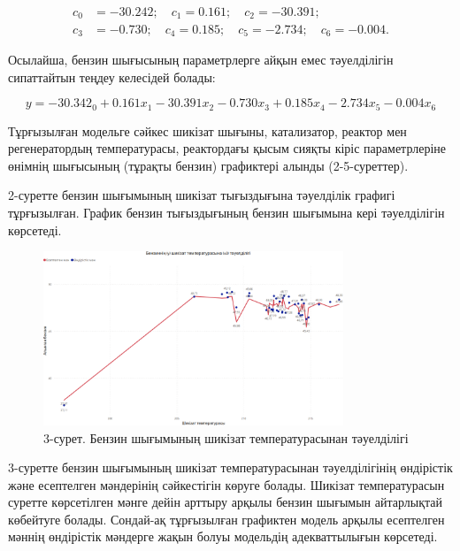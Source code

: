 \begin{equation*}
\begin{aligned}
c_0 &= -30.242; \quad c_1 = 0.161; \quad c_2 = -30.391; \\
c_3 &= -0.730; \quad c_4 = 0.185; \quad c_5 = -2.734; \quad c_6 = -0.004.
\end{aligned}
\end{equation*}

Осылайша, бензин шығысының параметрлерге айқын емес тәуелділігін
сипаттайтын теңдеу келесідей болады:

\begin{equation}
y=-30.342_0+0.161x_1-30.391x_2-0.730x_3+0.185x_4-2.734x_5-0.004x_6
\end{equation}

\begin{multicols}{2}
Тұрғызылған модельге сәйкес шикізат шығыны, катализатор, реактор мен
регенератордың температурасы, реактордағы қысым сияқты кіріс
параметрлеріне өнімнің шығысының (тұрақты бензин) графиктері алынды
(2-5-суреттер).

2-суретте бензин шығымының шикізат тығыздығына тәуелділік графигі
тұрғызылған. График бензин тығыздығының бензин шығымына кері
тәуелділігін көрсетеді.
\end{multicols}

\begin{figure}[H]
	\centering
	\includegraphics[width=0.8\textwidth]{media/ict/image96}
	\caption*{3-сурет. Бензин шығымының шикізат температурасынан тәуелділігі}
\end{figure}

\begin{multicols}{2}
3-суретте бензин шығымының шикізат температурасынан тәуелділігінің
өндірістік және есептелген мәндерінің сәйкестігін көруге болады. Шикізат
температурасын суретте көрсетілген мәнге дейін арттыру арқылы бензин
шығымын айтарлықтай көбейтуге болады. Сондай-ақ тұрғызылған графиктен
модель арқылы есептелген мәннің өндірістік мәндерге жақын болуы
модельдің адекваттылығын көрсетеді.
\end{multicols}

